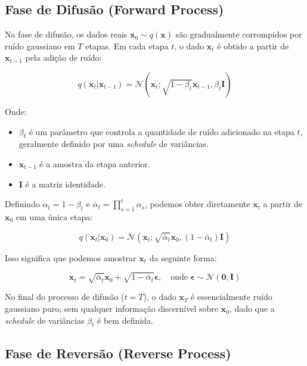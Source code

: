 \documentclass[a4paper]{tufte-handout}
\begin{document}
\subsection{Fase de Difusão (Forward Process)}

Na fase de difusão, os dados reais $\mathbf{x}_0 \sim q(\mathbf{x})$ são gradualmente corrompidos por ruído gaussiano em $T$ etapas. Em cada etapa $t$, o dado $\mathbf{x}_t$ é obtido a partir de $\mathbf{x}_{t-1}$ pela adição de ruído:

\begin{equation*}
    q(\mathbf{x}_t | \mathbf{x}_{t-1}) = \mathcal{N}(\mathbf{x}_t; \sqrt{1 - \beta_t} \mathbf{x}_{t-1}, \beta_t \mathbf{I})
\end{equation*}

Onde:
\begin{itemize}
    \item $\beta_t$ é um parâmetro que controla a quantidade de ruído adicionado na etapa $t$, geralmente definido por uma \textit{schedule} de variâncias.
    \item $\mathbf{x}_{t-1}$ é a amostra da etapa anterior.
    \item $\mathbf{I}$ é a matriz identidade.
\end{itemize}

Definindo $\alpha_t = 1 - \beta_t$ e $\bar{\alpha}_t = \prod_{s=1}^t \alpha_s$, podemos obter diretamente $\mathbf{x}_t$ a partir de $\mathbf{x}_0$ em uma única etapa:

\begin{equation*}
    q(\mathbf{x}_t | \mathbf{x}_0) = \mathcal{N}(\mathbf{x}_t; \sqrt{\bar{\alpha}_t} \mathbf{x}_0, (1 - \bar{\alpha}_t) \mathbf{I})
\end{equation*}

Isso significa que podemos amostrar $\mathbf{x}_t$ da seguinte forma:

\begin{equation*}
    \mathbf{x}_t = \sqrt{\bar{\alpha}_t} \mathbf{x}_0 + \sqrt{1 - \bar{\alpha}_t} \boldsymbol{\epsilon}, \quad \text{onde } \boldsymbol{\epsilon} \sim \mathcal{N}(\mathbf{0}, \mathbf{I})
\end{equation*}

No final do processo de difusão ($t = T$), o dado $\mathbf{x}_T$ é essencialmente ruído gaussiano puro, sem qualquer informação discernível sobre $\mathbf{x}_0$, dado que a \textit{schedule} de variâncias $\beta_t$ é bem definida.

\subsection{Fase de Reversão (Reverse Process)}
\end{document}
